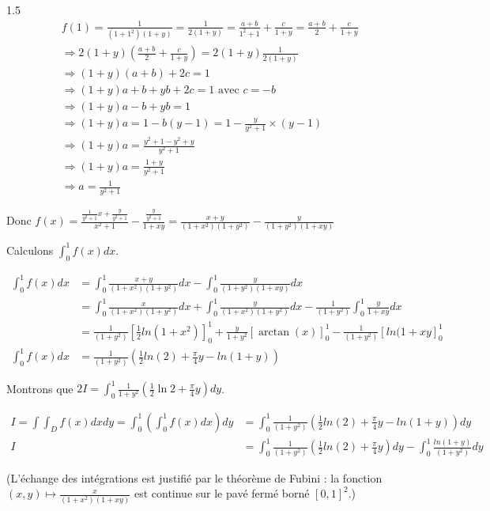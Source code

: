 \documentclass[12pt]{article}
\begin{document}
\begin{spacing}{1.5}
\begin{align*}
&f(1)=\frac{1}{(1+1^2)(1+y)}=\frac{1}{2(1+y)}=\frac{a+b}{1^2+1}+\frac{c}{1+y}=\frac{a+b}{2}+\frac{c}{1+y}\\
&\Rightarrow 2(1+y)(\frac{a+b}{2}+\frac{c}{1+y})=2(1+y)\frac{1}{2(1+y)}\\
&\Rightarrow (1+y)(a+b)+2c=1\\
&\Rightarrow (1+y)a+b+yb+2c=1 \text{ avec } c=-b\\
&\Rightarrow (1+y)a-b+yb=1\\
&\Rightarrow (1+y)a=1-b(y-1)=1-\frac{y}{y^2+1}\times(y-1)\\
&\Rightarrow (1+y)a=\frac{y^2+1-y^2+y}{y^2+1}\\
&\Rightarrow (1+y)a=\frac{1+y}{y^2+1}\\
&\Rightarrow a=\frac{1}{y^2+1}
\end{align*}

Donc $f(x)=\frac{\frac{1}{y^2+1}x+\frac{y}{y^2+1}}{x^2+1}-\frac{\frac{y}{y^2+1}}{1+xy}=\frac{x+y}{(1+x^2)(1+y^2)}-\frac{y}{(1+y^2)(1+xy)}$

Calculons $\int_{0}^{1}f(x)dx$.

\begin{align*}
\int_{0}^{1}f(x)dx &=\int_{0}^{1}\frac{x+y}{(1+x^2)(1+y^2)}dx-\int_{0}^{1}\frac{y}{(1+y^2)(1+xy)}dx\\
&=\int_{0}^{1}\frac{x}{(1+x^2)(1+y^2)}dx+\int_{0}^{1}\frac{y}{(1+x^2)(1+y^2)}dx-\frac{1}{(1+y^2)}\int_{0}^{1}\frac{y}{1+xy}dx\\
&=\frac{1}{(1+y^2)}[\frac{1}{2}ln(1+x^2)]_0^1+\frac{y}{1+y^2}[\arctan(x)]_0^1-\frac{1}{(1+y^2)}[ln(1+xy]_0^1\\
\int_{0}^{1}f(x)dx &=\frac{1}{(1+y^2)}(\frac{1}{2}ln(2)+\frac{\pi}{4}y-ln(1+y))
\end{align*}



Montrons que $2I = \int_{0}^{1}\frac{1}{1+y^2}\left(\frac{1}{2}\ln2 + \frac{\pi}{4}y\right)dy$.

\begin{align*}
I=\int\int_Df(x)dxdy=\int_{0}^{1}\left(\int_{0}^{1}f(x)dx\right)dy &=\int_{0}^{1}\frac{1}{(1+y^2)}\left(\frac{1}{2}ln(2)+\frac{\pi}{4}y-ln(1+y)\right)dy\\
I &=\int_{0}^{1}\frac{1}{(1+y^2)}\left(\frac{1}{2}ln(2)+\frac{\pi}{4}y\right)dy-\int_{0}^{1}\frac{ln(1+y)}{(1+y^2)}dy
\end{align*}

(L'échange des intégrations est justifié par le théorème de Fubini : la fonction $(x,y)\mapsto\frac{x}{(1+x^2)(1+xy)}$ est continue sur le pavé fermé borné $[0,1]^2$.)


\end{spacing}
\end{document}
